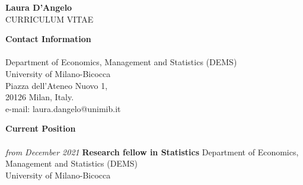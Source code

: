 \documentclass[10pt]{amsart}
\begin{document}
 \thispagestyle{empty}

	\begin{center}
	{\LARGE {\bf Laura D'Angelo}} \\[.5pc]
	CURRICULUM VITAE
	\end{center}

	\bigskip 


	{\large {\bf Contact Information}} \\[-.08cm] 
	\underline{\hspace{6in}} \\[.2cm] 
Department of Economics, Management and Statistics (DEMS)    \\
University of Milano-Bicocca     \\
Piazza dell'Ateneo Nuovo 1, \\
20126 Milan, Italy.           \\ \newline
e-mail: laura.dangelo@unimib.it
	\newline\newline

	{\large {\bf Current Position}} \\[-.08cm] 
	\underline{\hspace{6in}} \\[.2cm] 
	{\it from December 2021}\newline
	{\bf Research fellow in Statistics
	} 
	\newline 
	Department of Economics, Management and Statistics (DEMS)    \\
	University of Milano-Bicocca
	\newline 
\end{document}
